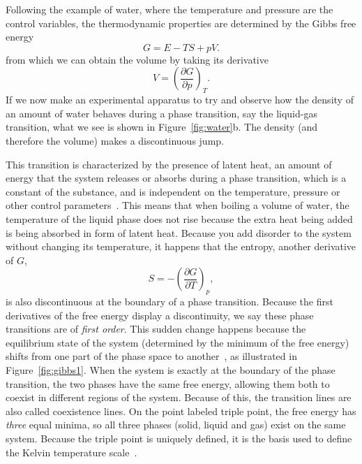 

Following the example of water, where the temperature and pressure are the
control variables, the thermodynamic properties are determined by the Gibbs
free energy
\begin{equation}
    G=E-TS+pV.
\end{equation}
from which we can obtain the volume by taking its derivative
\begin{equation}
    V={\left(\frac{\partial G}{\partial p}\right)}_T.
\end{equation}
If we now make an experimental apparatus to try and observe how the density of
an amount of water behaves during a phase transition, say the liquid-gas
transition, what we see is shown in Figure~\ref{fig:water}b. The density (and
therefore the volume) makes a discontinuous jump.

This transition is characterized by the presence of latent heat, an amount of
energy that the system releases or absorbs during a phase transition, which is
a constant of the substance, and is independent on the temperature, pressure or
other control parameters~\cite{Callen1985}. This means that when boiling a
volume of water, the temperature of the liquid phase does not rise because the
extra heat being added is being absorbed in form of latent heat. Because you
add disorder to the system without changing its temperature, it happens that
the entropy, another derivative of $G$,
\begin{equation}
    S=-{\left(\frac{\partial G}{\partial T}\right)}_p,
\end{equation}
is also discontinuous at the boundary of a phase transition. Because the first
derivatives of the free energy display a discontinuity, we say these phase
transitions are of \textit{first order}. This sudden change happens because the
equilibrium state of the system (determined by the minimum of the free energy)
shifts from one part of the phase space to another~\cite{Callen1985}, as
illustrated in Figure~\ref{fig:gibbs1}. When the system is exactly at the
boundary of the phase transition, the two phases have the same free energy,
allowing them both to coexist in different regions of the system. Because of
this, the transition lines are also called coexistence lines. On the point
labeled triple point, the free energy has \textit{three} equal minima, so all
three phases (solid, liquid and gas) exist on the same system. Because the
triple point is uniquely defined, it is the basis used to define the Kelvin
temperature scale~\cite{Fermi1956}.

